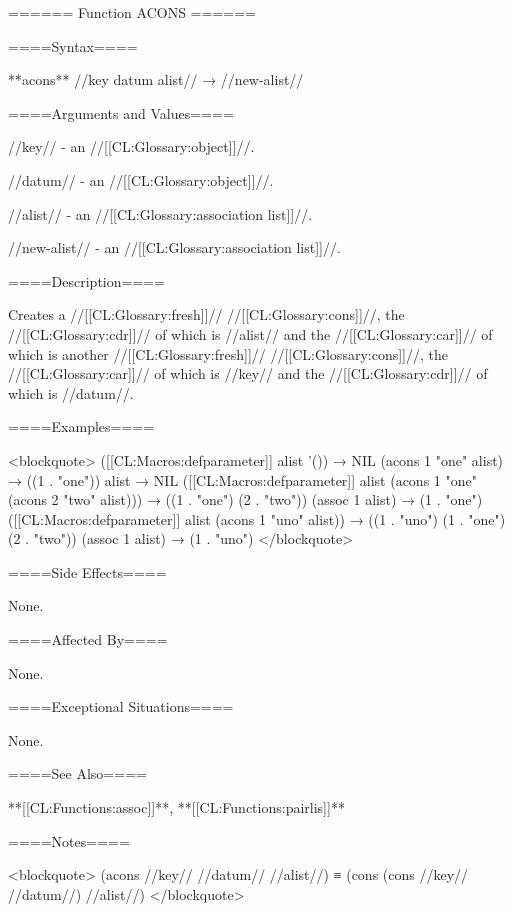 ====== Function ACONS ======

====Syntax====

**acons** //key datum alist// → //new-alist//

====Arguments and Values====

//key// - an //[[CL:Glossary:object]]//.

//datum// - an //[[CL:Glossary:object]]//.

//alist// - an //[[CL:Glossary:association list]]//.

//new-alist// - an //[[CL:Glossary:association list]]//.

====Description====

Creates a //[[CL:Glossary:fresh]]// //[[CL:Glossary:cons]]//, the //[[CL:Glossary:cdr]]// of which is //alist// and the //[[CL:Glossary:car]]// of which is another //[[CL:Glossary:fresh]]// //[[CL:Glossary:cons]]//, the //[[CL:Glossary:car]]// of which is //key// and the //[[CL:Glossary:cdr]]// of which is //datum//.

====Examples====

<blockquote> ([[CL:Macros:defparameter]] alist '()) → NIL (acons 1 "one" alist) → ((1 . "one")) alist → NIL ([[CL:Macros:defparameter]] alist (acons 1 "one" (acons 2 "two" alist))) → ((1 . "one") (2 . "two")) (assoc 1 alist) → (1 . "one") ([[CL:Macros:defparameter]] alist (acons 1 "uno" alist)) → ((1 . "uno") (1 . "one") (2 . "two")) (assoc 1 alist) → (1 . "uno") </blockquote>

====Side Effects====

None.

====Affected By====

None.

====Exceptional Situations====

None.

====See Also====

**[[CL:Functions:assoc]]**, **[[CL:Functions:pairlis]]**

====Notes====

<blockquote> (acons //key// //datum// //alist//) ≡ (cons (cons //key// //datum//) //alist//) </blockquote>

